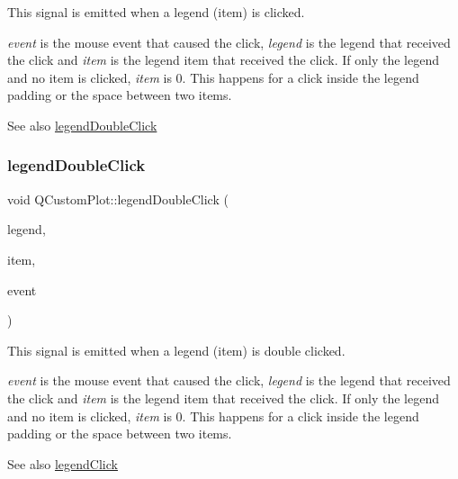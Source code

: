 This signal is emitted when a legend (item) is clicked.

{\itshape event} is the mouse event that caused the click, {\itshape legend} is the legend that received the click and {\itshape item} is the legend item that received the click. If only the legend and no item is clicked, {\itshape item} is 0. This happens for a click inside the legend padding or the space between two items.

\begin{DoxySeeAlso}{See also}
\hyperlink{classQCustomPlot_a0250f835c044521df1619b132288bca7}{legend\+Double\+Click} 
\end{DoxySeeAlso}
\mbox{\label{classQCustomPlot_a0250f835c044521df1619b132288bca7}} 
\subsubsection{\texorpdfstring{legend\+Double\+Click}{legendDoubleClick}}
{\footnotesize\ttfamily void Q\+Custom\+Plot\+::legend\+Double\+Click (\begin{DoxyParamCaption}\item[{\hyperlink{classQCPLegend}{Q\+C\+P\+Legend} $\ast$}]{legend,  }\item[{\hyperlink{classQCPAbstractLegendItem}{Q\+C\+P\+Abstract\+Legend\+Item} $\ast$}]{item,  }\item[{Q\+Mouse\+Event $\ast$}]{event }\end{DoxyParamCaption})\hspace{0.3cm}{\ttfamily [signal]}}

This signal is emitted when a legend (item) is double clicked.

{\itshape event} is the mouse event that caused the click, {\itshape legend} is the legend that received the click and {\itshape item} is the legend item that received the click. If only the legend and no item is clicked, {\itshape item} is 0. This happens for a click inside the legend padding or the space between two items.

\begin{DoxySeeAlso}{See also}
\hyperlink{classQCustomPlot_a79cff0baafbca10a3aaf694d2d3b9ab3}{legend\+Click} 
\end{DoxySeeAlso}
\mbox{\label{classQCustomPlot_a9b232142c64fcf273a953ee08e5b90e9}} 
